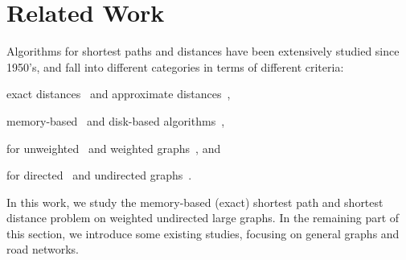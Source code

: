 \section{Related Work}
\label{sec-related}

 Algorithms for shortest  paths and distances have been extensively studied since 1950's, and fall into different categories
 in terms of different criteria:

 \bi
 \item exact distances~\cite{WuXDCZZ12,Dijkstra59,FredmanT84,LubyR89,GeisbergerSSD08,SankaranarayananSA09,SandersS05,GoldbergH05,MozesS12,ChengKCC12,MozesS12,ChanL07,SaundersT07,WagnerW07,bast2014route,delling2014robust,arz2013transit,zhu2013shortest,klein2010shortest,fakcharoenphol2006planar,gupta2004roads}
     and approximate distances~\cite{PotamiasBCG09,SarmaGNP10,ThorupZ05,SankaranarayananS10},


 \item memory-based~\cite{PotamiasBCG09,SarmaGNP10,WuXDCZZ12,Dijkstra59,FredmanT84,LubyR89,GeisbergerSSD08,Wei10,SankaranarayananSA09,SandersS05,
ThorupZ05,MozesS12,SaundersT07,WagnerW07,bast2014route,delling2014robust,arz2013transit,SankaranarayananS10,zhu2013shortest,klein2010shortest,gupta2004roads} and disk-based algorithms~\cite{ChengKCC12,ChanL07},


 \item for unweighted~\cite{PotamiasBCG09,SarmaGNP10,Wei10,bast2014route,delling2014robust,arz2013transit} and weighted graphs~\cite{WuXDCZZ12,Dijkstra59,FredmanT84,LubyR89,GeisbergerSSD08,SankaranarayananSA09,GoldbergH05,MozesS12,SandersS05,ChengKCC12,ThorupZ05,MozesS12,ChanL07,SaundersT07,WagnerW07,bast2014route,delling2014robust,arz2013transit,SankaranarayananS10,zhu2013shortest,klein2010shortest,fakcharoenphol2006planar,gupta2004roads},
     and


 \item for directed~\cite{SaundersT07,GoldbergH05,MozesS12,bast2014route,delling2014robust,arz2013transit,zhu2013shortest,klein2010shortest,fakcharoenphol2006planar} and undirected graphs~\cite{PotamiasBCG09,SarmaGNP10,WuXDCZZ12,Dijkstra59,FredmanT84,LubyR89,GeisbergerSSD08,Wei10,SankaranarayananSA09,SandersS05,ChengKCC12,ThorupZ05,MozesS12,ChanL07,WagnerW07,bast2014route,delling2014robust,arz2013transit,SankaranarayananS10,gupta2004roads}.
 \ei


In this work, we study the memory-based (exact)  shortest path and shortest distance problem on weighted undirected large graphs. In the remaining part of this section, we introduce some existing studies, focusing on general graphs and road networks.

